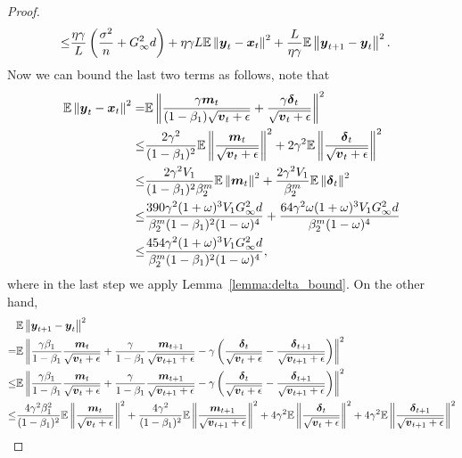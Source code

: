 \begin{proof}
\begin{align*}
        \leq & \frac{\eta\gamma}{L}\left(\frac{\sigma^2}{n} + G_\infty^2d \right) + \eta\gamma L\mathbb E\left\| \boldsymbol{y}_t - \boldsymbol{x}_t\right\|^2 + \frac{L}{\eta\gamma}\mathbb E\left\|\boldsymbol{y}_{t+1} - \boldsymbol{y}_t \right\|^2.
\end{align*}
Now we can bound the last two terms as follows, note that
\begin{align*}
    \mathbb E\left\| \boldsymbol{y}_t - \boldsymbol{x}_t\right\|^2 = & \mathbb E\left\| \frac{\gamma\boldsymbol{m}_t}{(1-\beta_1)\sqrt{\boldsymbol{v}_{t}+\epsilon}} + \frac{\gamma\boldsymbol{\delta}_{t}}{\sqrt{\boldsymbol{v}_{t}+\epsilon}}\right\|^2 \\
\leq & \frac{2\gamma^2}{(1-\beta_1)^2}\mathbb E\left\|\frac{\boldsymbol{m}_t}{\sqrt{\boldsymbol{v}_t+\epsilon}} \right\|^2 + 2\gamma^2\mathbb E\left\|\frac{\boldsymbol{\delta}_{t}}{\sqrt{\boldsymbol{v}_t+\epsilon}} \right\|^2 \\
    \leq & \frac{2\gamma^2V_1}{(1-\beta_1)^2\beta_2^m}\mathbb E\left\|\boldsymbol{m}_t \right\|^2 + \frac{2\gamma^2V_1}{\beta_2^m}\mathbb E\left\| \boldsymbol{\delta}_{t} \right\|^2 \\
\leq & \frac{390\gamma^2(1+\omega)^3V_1G_\infty^2d}{\beta_2^m(1-\beta_1)^2(1-\omega)^4} + \frac{64\gamma^2\omega(1+\omega)^3V_1G_\infty^2d}{\beta_2^m(1-\omega)^4} \\
\leq & \frac{454\gamma^2(1+\omega)^3V_1G_\infty^2d}{\beta_2^m(1-\beta_1)^2(1-\omega)^4},
\end{align*}
where in the last step we apply Lemma~\ref{lemma:delta_bound}.
On the other hand,
\begin{align*}
& \mathbb{E} \left\|\*{y}_{t+1} - \*{y}_t \right\|^2 \\
    = & \mathbb{E} \left\|\frac{\gamma\beta_1}{1-\beta_1}\frac{\*m_t}{\sqrt{\*v_t + \epsilon}}  + \frac{\gamma}{1- \beta_1} \frac{\*{m}_{t+1}}{\sqrt{\*v_{t+1}+\epsilon}} - \gamma\left( \frac{\*{\delta}_{t}}{\sqrt{\*v_{t}+\epsilon}} - \frac{\*{\delta}_{t+1}}{\sqrt{\*v_{t+1}+\epsilon}}\right) \right\|^2 \\
\leq & \mathbb{E} \left\|\frac{\gamma\beta_1}{1-\beta_1}\frac{\*m_t}{\sqrt{\*v_t + \epsilon}}  + \frac{\gamma}{1- \beta_1} \frac{\*{m}_{t+1}}{\sqrt{\*v_{t+1}+\epsilon}} - \gamma\left( \frac{\*{\delta}_{t}}{\sqrt{\*v_{t}+\epsilon}} - \frac{\*{\delta}_{t+1}}{\sqrt{\*v_{t+1}+\epsilon}}\right) \right\|^2 \\
    \leq & \frac{4\gamma^2\beta_1^2}{(1-\beta_1)^2}\mathbb{E} \left\|\frac{\*m_t}{\sqrt{\*v_t + \epsilon}} \right\|^2 + \frac{4\gamma^2}{(1-\beta_1)^2}\mathbb{E} \left\|\frac{\*{m}_{t+1}}{\sqrt{\*v_{t+1}+\epsilon}} \right\|^2 + 4\gamma^2\mathbb{E}\left\| \frac{\*{\delta}_{t}}{\sqrt{\*v_{t}+\epsilon}} \right\|^2 + 4\gamma^2\mathbb{E}\left\|\frac{\*{\delta}_{t+1}}{\sqrt{\*v_{t+1}+\epsilon}}\right\|^2 \\

\end{align*}
\end{proof}

